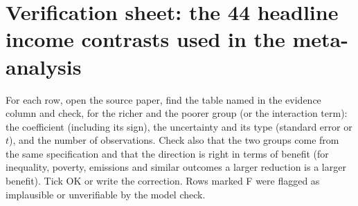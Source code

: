 \documentclass[10pt,a4paper]{article}
\begin{document}
\small
\section*{Verification sheet: the 44 headline income contrasts used in the meta-analysis}
For each row, open the source paper, find the table named in the evidence column and check, for the richer and the poorer group (or the interaction term): the coefficient (including its sign), the uncertainty and its type (standard error or $t$), and the number of observations. Check also that the two groups come from the same specification and that the direction is right in terms of benefit (for inequality, poverty, emissions and similar outcomes a larger reduction is a larger benefit). Tick OK or write the correction. Rows marked F were flagged as implausible or unverifiable by the model check.
\par\medskip\scriptsize
\end{document}
